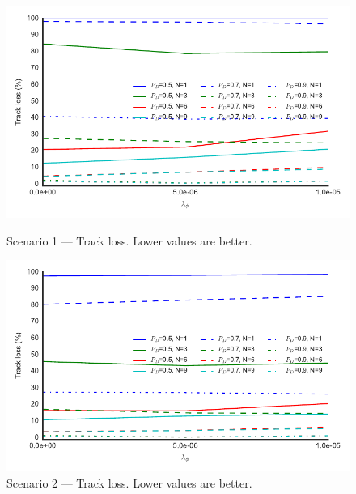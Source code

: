 \begin{figure}
\centering
\includegraphics{Figures/plots/Scenario1_Tracking-TrackLoss.pdf}
\caption{Scenario 1 --- Track loss. Lower values are better.}\label{fig:scenario1_track_loss}
\includegraphics{Figures/plots/Scenario2_Tracking-TrackLoss.pdf}
\caption{Scenario 2 --- Track loss. Lower values are better.}\label{fig:scenario2_track_loss}
\end{figure}

